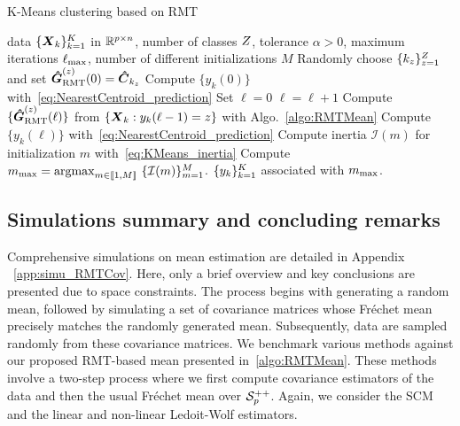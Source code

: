 \documentclass{article}
\theoremstyle{plain}
\theoremstyle{definition}
\theoremstyle{remark}
\begin{document}
\begin{algorithm}[t]
    \caption{K-Means clustering based on RMT}
    \label{algo:KMeans}
    \begin{algorithmic}
            data $\{\boldsymbol{X}_k\}_{k=1}^{K}$ in $\mathbb{R}^{p\times n}$,
            number of classes $Z$,
            tolerance $\alpha>0$,
            maximum iterations $\ell_{\textup{max}}$,
            number of different initializations $M$
        \STATE Randomly choose $\{k_z\}_{z=1}^{Z}$ and set $\boldsymbol{\hat{G}}_{\textup{RMT}}^{(z)}(0)=\boldsymbol{\hat{C}}_{k_z}$
        \STATE Compute $\{y_k(0)\}$ with~\eqref{eq:NearestCentroid_prediction}
        \STATE Set $\ell=0$
        \REPEAT
            \STATE $\ell=\ell+1$
            \STATE Compute $\{\boldsymbol{\hat{G}}_{\textup{RMT}}^{(z)}(\ell)\}$ from $\{\boldsymbol{X}_k: y_k(\ell-1)=z\}$ with Algo.~\ref{algo:RMTMean}
            \STATE Compute $\{y_k(\ell)\}$ with~\eqref{eq:NearestCentroid_prediction} 
        \STATE Compute inertia $\mathcal{I}(m)$ for initialization $m$ with~\eqref{eq:KMeans_inertia}
        \ENDFOR
        \STATE Compute $m_{\textup{max}} = \operatorname*{argmax}_{m\in\llbracket1,M\rrbracket} \,\, \{\mathcal{I}(m)\}_{m=1}^M$.
         $\{y_k\}_{k=1}^{K}$ associated with  $m_{\textup{max}}$.
    \end{algorithmic}
\end{algorithm}

\subsection{Simulations summary and concluding remarks}
\label{sec:mean:simu}

Comprehensive simulations on mean estimation are detailed in Appendix ~\ref{app:simu_RMTCov}. Here, only a brief overview and key conclusions are presented due to space constraints. The process begins with generating a random mean, followed by simulating a set of covariance matrices whose Fréchet mean precisely matches the randomly generated mean. Subsequently, data are sampled randomly from these covariance matrices. We benchmark various methods against our proposed RMT-based mean presented in~\ref{algo:RMTMean}.
These methods involve a two-step process where we first compute covariance estimators of the data and then the usual Fréchet mean over $\mathcal{S}^{++}_{p}$.
Again, we consider the SCM and the linear and non-linear Ledoit-Wolf estimators.
\end{document}
